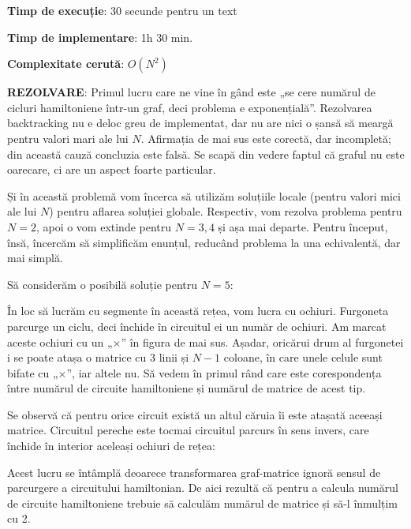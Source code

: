 {\bf Timp de execuție}: 30 secunde pentru un text

{\bf Timp de implementare}: 1h 30 min.

{\bf Complexitate cerută}: $O(N^2)$

{\bf REZOLVARE}: Primul lucru care ne vine în gând este „se cere numărul de
cicluri hamiltoniene într-un graf, deci problema e exponențială”. Rezolvarea
backtracking nu e deloc greu de implementat, dar nu are nici o șansă să meargă
pentru valori mari ale lui $N$. Afirmația de mai sus este corectă, dar
incompletă; din această cauză concluzia este falsă. Se scapă din vedere faptul
că graful nu este oarecare, ci are un aspect foarte particular.

Și în această problemă vom încerca să utilizăm soluțiile locale (pentru valori
mici ale lui $N$) pentru aflarea soluției globale. Respectiv, vom rezolva
problema pentru $N=2$, apoi o vom extinde pentru $N=3, 4$ și așa mai
departe. Pentru început, însă, încercăm să simplificăm enunțul, reducând
problema la una echivalentă, dar mai simplă.

Să considerăm o posibilă soluție pentru $N=5$:


În loc să lucrăm cu segmente în această rețea, vom lucra cu ochiuri. Furgoneta
parcurge un ciclu, deci închide în circuitul ei un număr de ochiuri. Am marcat
aceste ochiuri cu un „$\times$” în figura de mai sus. Așadar, oricărui drum al
furgonetei i se poate atașa o matrice cu 3 linii și $N-1$ coloane, în care
unele celule sunt bifate cu „$\times$”, iar altele nu. Să vedem în primul rând
care este corespondența între numărul de circuite hamiltoniene și numărul de
matrice de acest tip.

Se observă că pentru orice circuit există un altul căruia îi este atașată
aceeași matrice. Circuitul pereche este tocmai circuitul parcurs în sens
invers, care închide în interior aceleași ochiuri de rețea:


Acest lucru se întâmplă deoarece transformarea graf-matrice ignoră sensul de
parcurgere a circuitului hamiltonian. De aici rezultă că pentru a calcula
numărul de circuite hamiltoniene trebuie să calculăm numărul de matrice și
să-l înmulțim cu 2.

